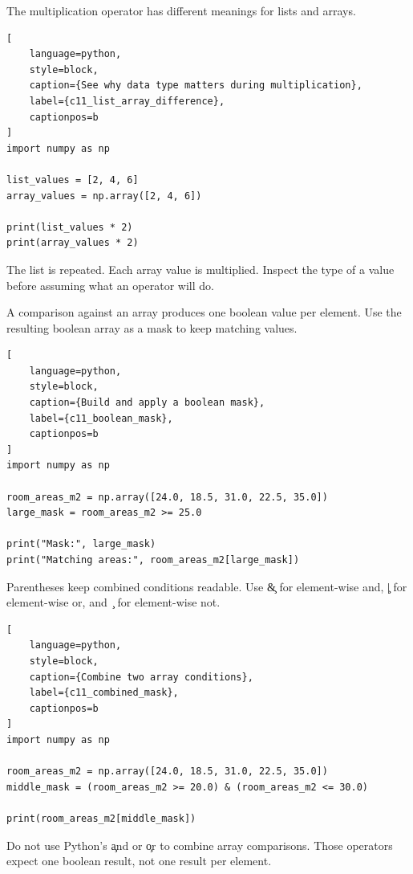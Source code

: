 
The multiplication operator has different meanings for lists and arrays.

\begin{lstlisting}[
    language=python,
    style=block,
    caption={See why data type matters during multiplication},
    label={c11_list_array_difference},
    captionpos=b
]
import numpy as np

list_values = [2, 4, 6]
array_values = np.array([2, 4, 6])

print(list_values * 2)
print(array_values * 2)
\end{lstlisting}

The list is repeated. Each array value is multiplied. Inspect the type of a
value before assuming what an operator will do.


A comparison against an array produces one boolean value per element. Use the
resulting boolean array as a mask to keep matching values.

\begin{lstlisting}[
    language=python,
    style=block,
    caption={Build and apply a boolean mask},
    label={c11_boolean_mask},
    captionpos=b
]
import numpy as np

room_areas_m2 = np.array([24.0, 18.5, 31.0, 22.5, 35.0])
large_mask = room_areas_m2 >= 25.0

print("Mask:", large_mask)
print("Matching areas:", room_areas_m2[large_mask])
\end{lstlisting}

Parentheses keep combined conditions readable. Use \c{&} for element-wise
and, \c{|} for element-wise or, and \c{~} for element-wise not.

\begin{lstlisting}[
    language=python,
    style=block,
    caption={Combine two array conditions},
    label={c11_combined_mask},
    captionpos=b
]
import numpy as np

room_areas_m2 = np.array([24.0, 18.5, 31.0, 22.5, 35.0])
middle_mask = (room_areas_m2 >= 20.0) & (room_areas_m2 <= 30.0)

print(room_areas_m2[middle_mask])
\end{lstlisting}

Do not use Python's \c{and} or \c{or} to combine array comparisons. Those
operators expect one boolean result, not one result per element.

